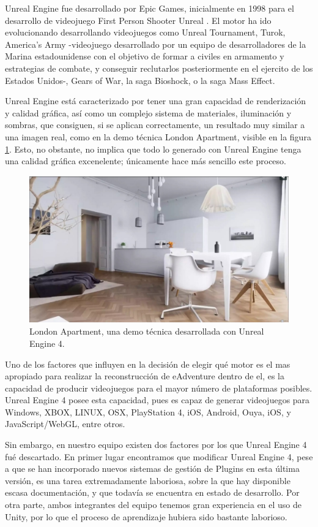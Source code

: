 Unreal Engine fue desarrollado por Epic Games, inicialmente en 1998 para el desarrollo de videojuego First Person Shooter Unreal \cite{unrealengine}. El motor ha ido evolucionando desarrollando videojuegos como Unreal Tournament, Turok, America's Army -videojuego desarrollado por un equipo de desarrolladores de la Marina estadounidense con el objetivo de formar a civiles en armamento y estrategias de combate, y conseguir reclutarlos posteriormente en el ejercito de los Estados Unidos-, Gears of War, la saga Bioshock, o la saga Mass Effect. 

Unreal Engine está caracterizado por tener una gran capacidad de renderización y calidad gráfica, así como un complejo sistema de materiales, iluminación y sombras, que consiguen, si se aplican correctamente, un resultado muy similar a una imagen real, como en la demo técnica London Apartment, visible en la figura \ref{londonapartment}. Esto, no obstante, no implica que todo lo generado con Unreal Engine tenga una calidad gráfica excenelente; únicamente hace más sencillo este proceso.

\begin{figure}[htb]
	\centerline{\includegraphics[height=2.5in]{figures/london-apartment.jpg}}
	\caption[Unreal Engine 4 - London Apartment]{London Apartment, una demo técnica desarrollada con Unreal Engine 4.}
	\label{londonapartment}
\end{figure}

Uno de los factores que influyen en la decisión de elegir qué motor es el mas apropiado para realizar la reconstrucción de eAdventure dentro de el, es la capacidad de producir videojuegos para el mayor número de plataformas posibles. Unreal Engine 4 posee esta capacidad, pues es capaz de generar videojuegos para Windows, XBOX, LINUX, OSX, PlayStation 4, iOS, Android, Ouya, iOS, y JavaScript/WebGL, entre otros.

Sin embargo, en nuestro equipo existen dos factores por los que Unreal Engine 4 fué descartado. En primer lugar encontramos que modificar Unreal Engine 4, pese a que se han incorporado nuevos sistemas de gestión de Plugins en esta última versión, es una tarea extremadamente laboriosa, sobre la que hay disponible escasa documentación, y que todavía se encuentra en estado de desarrollo. Por otra parte, ambos integrantes del equipo tenemos gran experiencia en el uso de Unity, por lo que el proceso de aprendizaje hubiera sido bastante laborioso.

